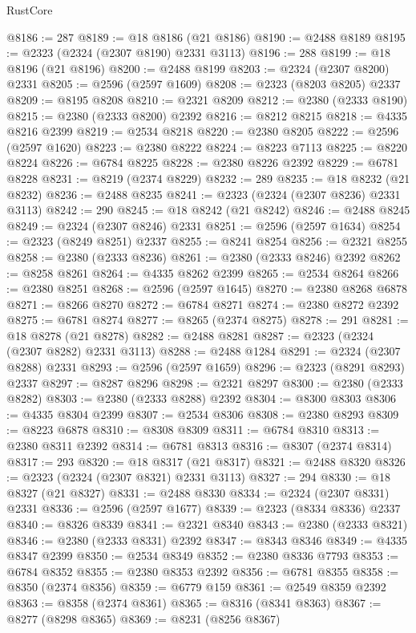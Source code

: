 \begin{lexlean}{RustCore}
\begin{coremodule}
@8186 := 287
@8189 := @18 @8186 (@21 @8186)
@8190 := @2488 @8189
@8195 := @2323 (@2324 (@2307 @8190) @2331 @3113)
@8196 := 288
@8199 := @18 @8196 (@21 @8196)
@8200 := @2488 @8199
@8203 := @2324 (@2307 @8200) @2331
@8205 := @2596 (@2597 @1609)
@8208 := @2323 (@8203 @8205) @2337
@8209 := @8195 @8208
@8210 := @2321 @8209
@8212 := @2380 (@2333 @8190)
@8215 := @2380 (@2333 @8200) @2392
@8216 := @8212 @8215
@8218 := @4335 @8216 @2399
@8219 := @2534 @8218
@8220 := @2380 @8205
@8222 := @2596 (@2597 @1620)
@8223 := @2380 @8222
@8224 := @8223 @7113
@8225 := @8220 @8224
@8226 := @6784 @8225
@8228 := @2380 @8226 @2392
@8229 := @6781 @8228
@8231 := @8219 (@2374 @8229)
@8232 := 289
@8235 := @18 @8232 (@21 @8232)
@8236 := @2488 @8235
@8241 := @2323 (@2324 (@2307 @8236) @2331 @3113)
@8242 := 290
@8245 := @18 @8242 (@21 @8242)
@8246 := @2488 @8245
@8249 := @2324 (@2307 @8246) @2331
@8251 := @2596 (@2597 @1634)
@8254 := @2323 (@8249 @8251) @2337
@8255 := @8241 @8254
@8256 := @2321 @8255
@8258 := @2380 (@2333 @8236)
@8261 := @2380 (@2333 @8246) @2392
@8262 := @8258 @8261
@8264 := @4335 @8262 @2399
@8265 := @2534 @8264
@8266 := @2380 @8251
@8268 := @2596 (@2597 @1645)
@8270 := @2380 @8268 @6878
@8271 := @8266 @8270
@8272 := @6784 @8271
@8274 := @2380 @8272 @2392
@8275 := @6781 @8274
@8277 := @8265 (@2374 @8275)
@8278 := 291
@8281 := @18 @8278 (@21 @8278)
@8282 := @2488 @8281
@8287 := @2323 (@2324 (@2307 @8282) @2331 @3113)
@8288 := @2488 @1284
@8291 := @2324 (@2307 @8288) @2331
@8293 := @2596 (@2597 @1659)
@8296 := @2323 (@8291 @8293) @2337
@8297 := @8287 @8296
@8298 := @2321 @8297
@8300 := @2380 (@2333 @8282)
@8303 := @2380 (@2333 @8288) @2392
@8304 := @8300 @8303
@8306 := @4335 @8304 @2399
@8307 := @2534 @8306
@8308 := @2380 @8293
@8309 := @8223 @6878
@8310 := @8308 @8309
@8311 := @6784 @8310
@8313 := @2380 @8311 @2392
@8314 := @6781 @8313
@8316 := @8307 (@2374 @8314)
@8317 := 293
@8320 := @18 @8317 (@21 @8317)
@8321 := @2488 @8320
@8326 := @2323 (@2324 (@2307 @8321) @2331 @3113)
@8327 := 294
@8330 := @18 @8327 (@21 @8327)
@8331 := @2488 @8330
@8334 := @2324 (@2307 @8331) @2331
@8336 := @2596 (@2597 @1677)
@8339 := @2323 (@8334 @8336) @2337
@8340 := @8326 @8339
@8341 := @2321 @8340
@8343 := @2380 (@2333 @8321)
@8346 := @2380 (@2333 @8331) @2392
@8347 := @8343 @8346
@8349 := @4335 @8347 @2399
@8350 := @2534 @8349
@8352 := @2380 @8336 @7793
@8353 := @6784 @8352
@8355 := @2380 @8353 @2392
@8356 := @6781 @8355
@8358 := @8350 (@2374 @8356)
@8359 := @6779 @159
@8361 := @2549 @8359 @2392
@8363 := @8358 (@2374 @8361)
@8365 := @8316 (@8341 @8363)
@8367 := @8277 (@8298 @8365)
@8369 := @8231 (@8256 @8367)

\end{coremodule}
\end{lexlean}
